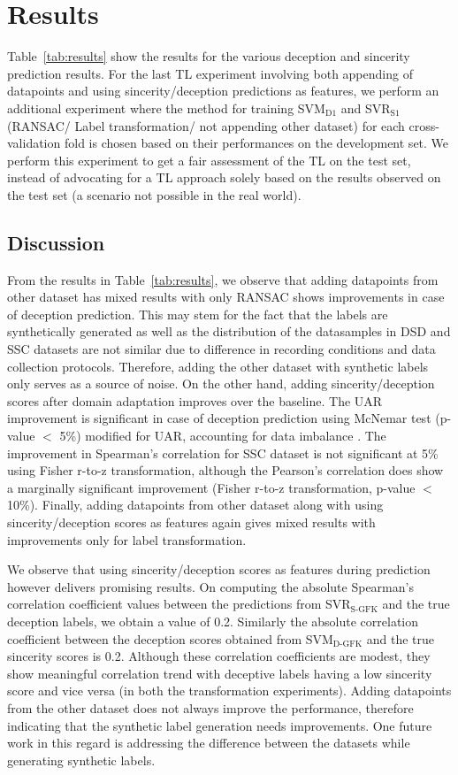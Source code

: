 \documentclass{article}
\begin{document}
\section{Results}
Table~\ref{tab:results} show the results for the various deception and sincerity prediction results. 
For the last TL experiment involving both appending of datapoints and using sincerity/deception predictions as features, we perform an additional experiment where the method for training SVM$_\text{D1}$ and SVR$_\text{S1}$ (RANSAC/ Label transformation/ not appending other dataset) for each cross-validation fold is chosen based on their performances on the development set. 
We perform this experiment to get a fair assessment of the TL on the test set, instead of advocating for a TL approach solely based on the results observed on the test set (a scenario not possible in the real world).

\subsection{Discussion}
From the results in Table~\ref{tab:results}, we observe that adding datapoints from other dataset has mixed results with only RANSAC shows improvements in case of deception prediction.
This may stem for the fact that the labels are synthetically generated as well as the distribution of the datasamples in DSD and SSC datasets are not similar due to difference in recording conditions and data collection protocols. 
Therefore, adding the other dataset with synthetic labels only serves as a source of noise.
On the other hand, adding sincerity/deception scores after domain adaptation improves over the baseline. 
The UAR improvement is significant in case of deception prediction using McNemar test (p-value $<$ 5\%) modified for UAR, accounting for data imbalance \cite{}.
The improvement in Spearman's correlation for SSC dataset is not significant at 5\% using Fisher r-to-z transformation, although the Pearson's correlation does show a marginally significant improvement (Fisher r-to-z transformation, p-value $<$ 10\%). 
Finally, adding datapoints from other dataset along with using sincerity/deception scores as features again gives mixed results with improvements only for label transformation. 

We observe that using sincerity/deception scores as features during prediction however delivers promising results.
On computing the absolute Spearman's correlation coefficient values between the predictions from SVR$_\text{S-GFK}$ and the true deception labels, we obtain a value of 0.2.
Similarly the absolute correlation coefficient between the deception scores obtained from SVM$_\text{D-GFK}$ and the true sincerity scores is 0.2.
Although these correlation coefficients are modest, they show meaningful correlation trend with deceptive labels having a low sincerity score and vice versa (in both the transformation experiments).  
Adding datapoints from the other dataset does not always improve the performance, therefore indicating that the synthetic label generation needs improvements. 
One future work in this regard is addressing the difference between the datasets while generating synthetic labels. 
 
\end{document}
